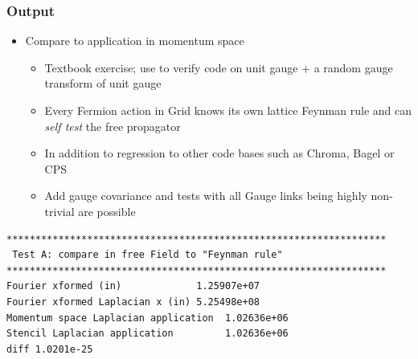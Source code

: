 \documentclass[pdf,ps,8pt]{beamer}
\begin{document}
\begin{frame}[fragile]\small\frametitle{Output}
  \begin{itemize}
  \item Compare to application in momentum space
    \begin{itemize}
      \item Textbook exercise; use to verify code on unit gauge + a random gauge transform of unit gauge
      \item Every Fermion action in Grid knows its own lattice Feynman rule and can \emph{self test} the free propagator
      \item In addition to regression to other code bases such as Chroma, Bagel or CPS
      \item Add gauge covariance and tests with all Gauge links being highly non-trivial are possible
    \end{itemize}
    \end{itemize}
  
{\tiny \begin{verbatim}
******************************************************************
 Test A: compare in free Field to "Feynman rule"  
******************************************************************
Fourier xformed (in)             1.25907e+07
Fourier xformed Laplacian x (in) 5.25498e+08
Momentum space Laplacian application  1.02636e+06
Stencil Laplacian application         1.02636e+06
diff 1.0201e-25
  \end{verbatim} 
}
\end{frame}
\end{document}
